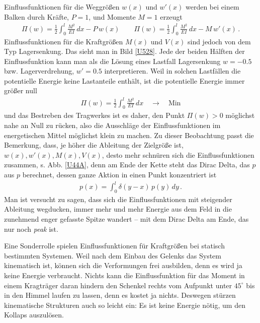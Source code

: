 {{{{{{Einflussfunktionen f\"{u}r die Weggr\"{o}{\ss}en $w(x)$ und $w'(x)$ werden bei einem Balken durch Kr\"{a}fte, $P = 1$, und Momente $M = 1$ erzeugt
\begin{align}
\Pi(w) = \frac{1}{2} \int_{0}^{l} \frac{M^2}{EI}\,dx - P\,w(x) \qquad \Pi(w) = \frac{1}{2} \int_{0}^{l} \frac{M^2}{EI}\,dx - M\,w'(x)\,.
\end{align}
Einflussfunktionen f\"{u}r die Kraftgr\"{o}{\ss}en $M(x)$ und $V(x)$ sind jedoch von dem Typ Lagersenkung. Das sieht man in Bild \ref{U528}. Jede der beiden H\"{a}lften der Einflussfunktion kann man als die L\"{o}sung eines Lastfall Lagersenkung $w = -0.5$ bzw. Lagerverdrehung, $w' = 0.5$ interpretieren. Weil in solchen Lastf\"{a}llen die potentielle Energie keine Lastanteile enth\"{a}lt, ist die potentielle Energie immer gr\"{o}{\ss}er null
\begin{align}
\Pi(w) = \frac{1}{2} \int_{0}^{l} \frac{M^2}{EI}\,dx \quad \to \quad \text{Min}
\end{align}
und das Bestreben des Tragwerkes ist es daher, den Punkt $\Pi(w) > 0 $ m\"{o}glichst nahe an Null zu r\"{u}cken, also die Ausschl\"{a}ge der Einflussfunktionen im energetischen Mittel m\"{o}glichst klein zu machen. Zu dieser Beobachtung passt die Bemerkung, dass, je h\"{o}her die Ableitung der Zielgr\"{o}{\ss}e ist, $w(x), w'(x), M(x), V(x)$, desto mehr schn\"{u}ren sich die Einflussfunktionen zusammen, s. Abb. \ref{U44A}, denn am Ende der Kette steht das Dirac Delta, das $p$ aus $p$ berechnet, dessen ganze Aktion in einen Punkt konzentriert ist
\begin{align}
p(x) = \int_{0}^{l} \delta(y-x)\,p(y)\,dy\,.
\end{align}
Man ist versucht zu sagen, dass sich die Einflussfunktionen mit steigender Ableitung \glq wegducken\grq{}, immer mehr und mehr Energie aus dem Feld in die zunehmend enger gefasste Spitze wandert -- mit dem Dirac Delta am Ende, das nur noch {\em peak\/} ist.

Eine Sonderrolle spielen Einflussfunktionen f\"{u}r Kraftgr\"{o}{\ss}en bei statisch bestimmten Systemen. Weil nach dem Einbau des Gelenks das System kinematisch ist, k\"{o}nnen sich die Verformungen frei ausbilden, denn es wird ja keine Energie verbraucht. Nichts kann die Einflussfunktion f\"{u}r das Moment in einem Kragtr\"{a}ger daran hindern den Schenkel rechts vom Aufpunkt unter $45^\circ$ bis \glq in den Himmel\grq{} laufen zu lassen, denn es kostet ja nichts. Deswegen st\"{u}rzen kinematische Strukturen auch so leicht ein: Es ist keine Energie n\"{o}tig, um den Kollaps auszul\"{o}sen.

}}}}}}
